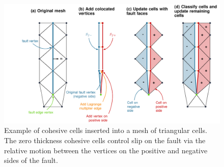 \noindent \begin{center}
\begin{figure}[H]
\begin{centering}
\includegraphics[width=6.25in]{boundaryconditions/figs/cohesivecell}
\par\end{centering}

\caption{Example of cohesive cells inserted into a mesh of triangular cells.
The zero thickness cohesive cells control slip on the fault via the
relative motion between the vertices on the positive and negative
sides of the fault.\label{fig:fault:cohesive:cells} }
\end{figure}

\par\end{center}

